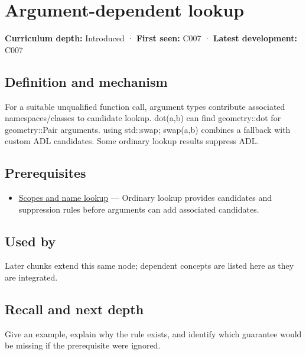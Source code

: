 \hypertarget{appendix-7863714aa97f}{}
\section{Argument-dependent lookup}\label{appendix-7863714aa97f-argument-dependent-lookup}

\textbf{Curriculum depth:} Introduced · \textbf{First seen:} C007 · \textbf{Latest development:} C007

\subsection{Definition and mechanism}\label{appendix-7863714aa97f-definition-and-mechanism}

For a suitable unqualified function call, argument types contribute associated namespaces/classes to candidate lookup. dot(a,b) can find geometry::dot for geometry::Pair arguments. using std::swap; swap(a,b) combines a fallback with custom ADL candidates. Some ordinary lookup results suppress ADL.

\subsection{Prerequisites}\label{appendix-7863714aa97f-prerequisites}

\begin{itemize}
\tightlist
\item
  \hyperref[appendix-b12b31759da1]{Scopes and name lookup} --- Ordinary lookup provides candidates and suppression rules before arguments can add associated candidates.
\end{itemize}

\subsection{Used by}\label{appendix-7863714aa97f-used-by}

Later chunks extend this same node; dependent concepts are listed here as they are integrated.

\subsection{Recall and next depth}\label{appendix-7863714aa97f-recall-and-next-depth}

Give an example, explain why the rule exists, and identify which guarantee would be missing if the prerequisite were ignored.

